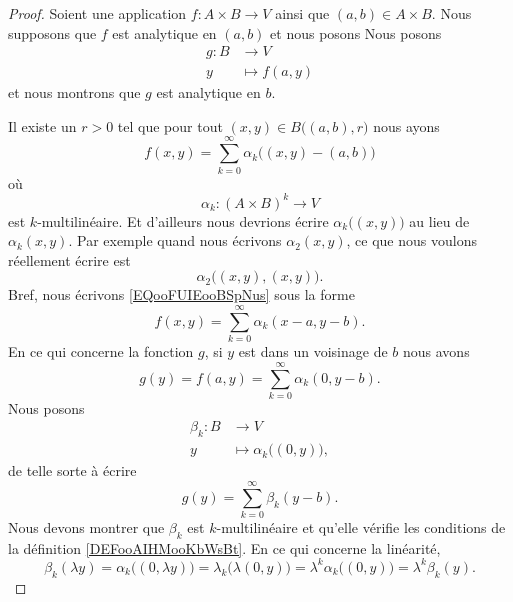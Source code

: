 \begin{proof}
	Soient une application \(f \colon A\times B\to V  \) ainsi que \( (a,b)\in A\times B\). Nous supposons que \( f\) est analytique en \( (a,b)\) et nous posons
	Nous posons
	\begin{equation}
		\begin{aligned}
			g\colon B & \to V          \\
			y         & \mapsto f(a,y)
		\end{aligned}
	\end{equation}
	et nous montrons que \( g\) est analytique en \( b\).

	Il existe un \( r>0\) tel que pour tout \( (x,y)\in B\big( (a,b),r \big)\) nous ayons
	\begin{equation}		\label{EQooFUIEooBSpNus}
		f(x,y)=\sum_{k=0}^{\infty}\alpha_k\big( (x,y)-(a,b) \big)
	\end{equation}
	où
	\begin{equation}
		\alpha_k \colon (A\times B)^k\to V
	\end{equation}
	est \( k\)-multilinéaire. Et d'ailleurs nous devrions écrire \( \alpha_k\big( (x,y) \big)\) au lieu de \( \alpha_k(x,y)\). Par exemple quand nous écrivons \( \alpha_2(x,y)\), ce que nous voulons réellement écrire est
	\begin{equation}
		\alpha_2\big( (x,y),(x,y) \big).
	\end{equation}
	Bref, nous écrivons \eqref{EQooFUIEooBSpNus} sous la forme
	\begin{equation}
		f(x,y)=\sum_{k=0}^{\infty}\alpha_k(x-a,y-b).
	\end{equation}
	En ce qui concerne la fonction \( g\), si \( y\) est dans un voisinage de \( b\) nous avons
	\begin{equation}
		g(y)=f(a,y)=\sum_{k=0}^{\infty}\alpha_k(0,y-b).
	\end{equation}
	Nous posons
	\begin{equation}
		\begin{aligned}
			\beta_k\colon B & \to V                              \\
			y               & \mapsto \alpha_k\big( (0,y) \big),
		\end{aligned}
	\end{equation}
	de telle sorte à écrire
	\begin{equation}
		g(y)=\sum_{k=0}^{\infty}\beta_k(y-b).
	\end{equation}
	Nous devons montrer que \( \beta_k\) est \( k\)-multilinéaire et qu'elle vérifie les conditions de la définition \ref{DEFooAIHMooKbWsBt}. En ce qui concerne la linéarité,
	\begin{equation}
		\beta_k(\lambda y)=\alpha_k\big( (0,\lambda y) \big)=\lambda_k\big( \lambda(0,y) \big)=\lambda^k\alpha_k\big( (0,y) \big)=\lambda^k\beta_k(y).
	\end{equation}


\end{proof}
